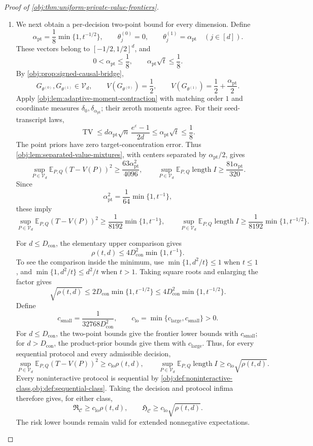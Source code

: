 \documentclass[11pt]{article}
\begin{document}
\begin{proof}[Proof of \cref{obj:thm:uniform-private-value-frontiers}]
\begin{enumerate}
\item
We next obtain a per-decision two-point bound for every dimension. Define
\[
\alpha_{\mathrm{pt}}
=\frac18\min\{1,t^{-1/2}\},
\qquad
\theta^{(0)}_j=0,\qquad
\theta^{(1)}_j=\alpha_{\mathrm{pt}}
\quad(j\in[d]).
\]
These vectors belong to \([-1/2,1/2]^d\), and
\[
0<\alpha_{\mathrm{pt}}\le\frac18,\qquad
\alpha_{\mathrm{pt}}\sqrt t\le\frac18.
\]
By \cref{obj:prop:signed-causal-bridge},
\[
G_{\theta^{(0)}},G_{\theta^{(1)}}\in\mathcal V_d,
\qquad
V(G_{\theta^{(0)}})=\frac12,\qquad
V(G_{\theta^{(1)}})=\frac12+\frac{\alpha_{\mathrm{pt}}}{2}.
\]
Apply \cref{obj:lem:adaptive-moment-contraction} with matching order \(1\) and coordinate measures \(\delta_0,\delta_{\alpha_{\mathrm{pt}}}\); their zeroth moments agree. For their seed-transcript laws,
\[
\operatorname{TV}
\le d\alpha_{\mathrm{pt}}\sqrt n\,
       \frac{e^\varepsilon-1}{2d}
\le\alpha_{\mathrm{pt}}\sqrt t
\le\frac18.
\]
The point priors have zero target-concentration error. Thus \cref{obj:lem:separated-value-mixtures}, with centers separated by
\(\alpha_{\mathrm{pt}}/2\), gives
\[
\sup_{P\in\mathcal V_d}\mathbb E_{P,Q}(T-V(P))^2
\ge\frac{63\alpha_{\mathrm{pt}}^2}{4096},
\qquad
\sup_{P\in\mathcal V_d}\mathbb E_{P,Q}\operatorname{length}I
\ge\frac{81\alpha_{\mathrm{pt}}}{320}.
\]
Since
\[
\alpha_{\mathrm{pt}}^2=\frac1{64}\min\{1,t^{-1}\},
\]
these imply
\[
\sup_{P\in\mathcal V_d}\mathbb E_{P,Q}(T-V(P))^2
\ge\frac1{8192}\min\{1,t^{-1}\},
\qquad
\sup_{P\in\mathcal V_d}\mathbb E_{P,Q}\operatorname{length}I
\ge\frac1{8192}\min\{1,t^{-1/2}\}.
\]

For \(d\le D_{\mathrm{con}}\), the elementary upper comparison gives
\[
\rho(t,d)\le4D_{\mathrm{con}}^2\min\{1,t^{-1}\}.
\]
To see the comparison inside the minimum, use
\(\min\{1,d^2/t\}\le1\) when \(t\le1\), and
\(\min\{1,d^2/t\}\le d^2/t\) when \(t>1\).
Taking square roots and enlarging the factor gives
\[
\sqrt{\rho(t,d)}
\le2D_{\mathrm{con}}\min\{1,t^{-1/2}\}
\le4D_{\mathrm{con}}^2\min\{1,t^{-1/2}\}.
\]
Define
\[
c_{\mathrm{small}}=\frac1{32768D_{\mathrm{con}}^2},
\qquad
c_{\mathrm{lo}}=\min\{c_{\mathrm{large}},c_{\mathrm{small}}\}>0.
\]
For \(d\le D_{\mathrm{con}}\), the two-point bounds give the frontier lower bounds with \(c_{\mathrm{small}}\); for \(d>D_{\mathrm{con}}\), the product-prior bounds give them with \(c_{\mathrm{large}}\). Thus, for every sequential protocol and every admissible decision,
\[
\sup_{P\in\mathcal V_d}\mathbb E_{P,Q}(T-V(P))^2
\ge c_{\mathrm{lo}}\rho(t,d),
\qquad
\sup_{P\in\mathcal V_d}\mathbb E_{P,Q}\operatorname{length}I
\ge c_{\mathrm{lo}}\sqrt{\rho(t,d)}.
\]
Every noninteractive protocol is sequential by
\cref{obj:def:noninteractive-class,obj:def:sequential-class}.
Taking the decision and protocol infima therefore gives, for either class,
\[
\mathfrak R_{\mathcal C}\ge c_{\mathrm{lo}}\rho(t,d),
\qquad
\mathfrak H_{\mathcal C}\ge c_{\mathrm{lo}}\sqrt{\rho(t,d)}.
\]
The risk lower bounds remain valid for extended nonnegative expectations.


\end{enumerate}
\end{proof}
\end{document}
